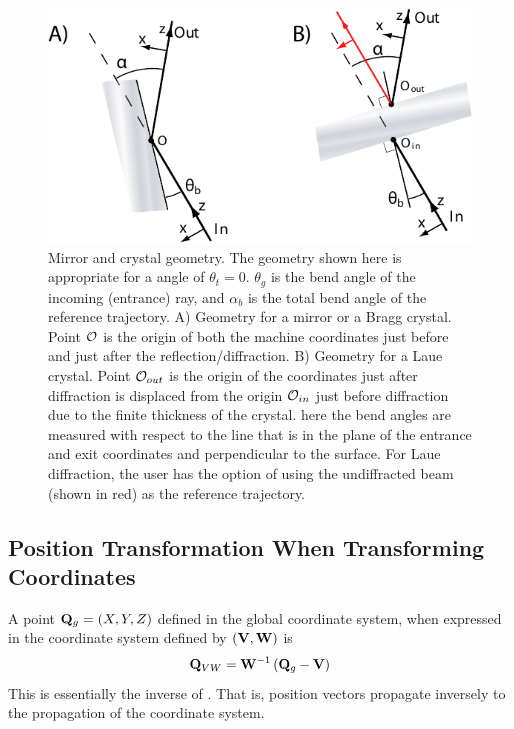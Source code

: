 \begin{figure}
  \centering \includegraphics{mirror.pdf} 
\caption[Mirror and crystal geometry] {Mirror and crystal geometry.  The geometry shown here is
appropriate for a  angle of $\theta_t = 0$.  $\theta_g$ is the bend angle of the
incoming (entrance) ray, and $\alpha_b$ is the total bend angle of the reference trajectory. A)
Geometry for a mirror or a Bragg crystal. Point ${\cal O}$ is the origin of both the machine coordinates
just before and just after the reflection/diffraction. B) Geometry for a Laue crystal.  Point
${\cal O}_{out}$ is the origin of the coordinates just after diffraction is displaced from the origin
${\cal O}_{in}$ just before diffraction due to the finite thickness of the crystal. here the bend
angles are measured with respect to the line that is in the plane of the entrance and exit
coordinates and perpendicular to the surface. For Laue diffraction, the user has the option of using
the undiffracted beam (shown in red) as the reference trajectory.
  }  
  \label{f:mirror}
\end{figure}

\subsection{Position Transformation When Transforming Coordinates}
\label{s:pos.trans}

A point ${\bf Q}_g = (X, Y, Z)$ defined in the global coordinate system, when expressed in the
coordinate system defined by $({\bf V}, {\bf W})$ is
\begin{equation}
  {\bf Q}_{VW} = {\bf W}^{-1} \left( {\bf Q}_g - {\bf V} \right)
  \label{rwrv}
\end{equation}
This is essentially the inverse of . That is, position vectors propagate inversely to the
propagation of the coordinate system.

